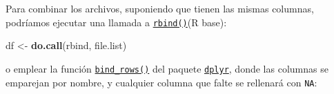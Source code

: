 \documentclass[
]{book}
\newenvironment{Shaded}{\begin{snugshade}}{\end{snugshade}}
\newcommand{\AttributeTok}[1]{\textcolor[rgb]{0.13,0.29,0.53}{#1}}
\newcommand{\CommentTok}[1]{\textcolor[rgb]{0.56,0.35,0.01}{\textit{#1}}}
\newcommand{\ControlFlowTok}[1]{\textcolor[rgb]{0.13,0.29,0.53}{\textbf{#1}}}
\newcommand{\FunctionTok}[1]{\textcolor[rgb]{0.13,0.29,0.53}{\textbf{#1}}}
\newcommand{\NormalTok}[1]{#1}
\newcommand{\OtherTok}[1]{\textcolor[rgb]{0.56,0.35,0.01}{#1}}
\newcommand{\SpecialCharTok}[1]{\textcolor[rgb]{0.81,0.36,0.00}{\textbf{#1}}}
\newcommand{\StringTok}[1]{\textcolor[rgb]{0.31,0.60,0.02}{#1}}
\theoremstyle{break}
\theoremstyle{nonumberplain}
\renewcommand{\CommentTok}[1]{\textcolor[rgb]{0.41,0.41,0.41}{\texttt{#1}}}
\begin{document}
\begin{Shaded}
\end{Shaded}

Para combinar los archivos, suponiendo que tienen las mismas columnas, podríamos ejecutar una llamada a \href{https://www.rdocumentation.org/packages/base/versions/3.6.1/topics/rbind}{\texttt{rbind()}}(R base):

\begin{Shaded}
\begin{Highlighting}[]
\NormalTok{df }\OtherTok{\textless{}{-}} \FunctionTok{do.call}\NormalTok{(}\StringTok{\textquotesingle{}rbind\textquotesingle{}}\NormalTok{, file.list)}
\end{Highlighting}
\end{Shaded}

o emplear la función \href{https://www.rdocumentation.org/packages/dplyr/versions/0.7.8/topics/bind}{\texttt{bind\_rows()}}
del paquete \href{https://dplyr.tidyverse.org}{\texttt{dplyr}}, donde las columnas se emparejan por nombre, y cualquier columna que falte se rellenará con \texttt{NA}:
\end{document}
